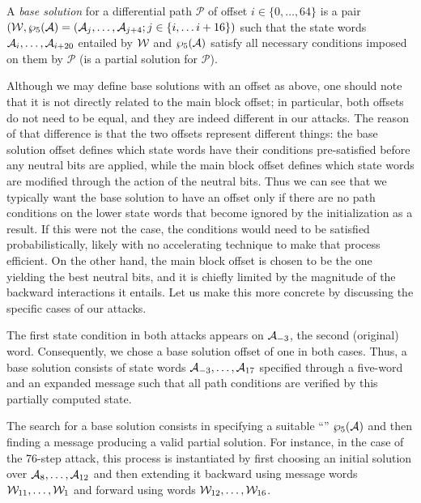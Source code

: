 \begin{defi}
A \emph{base solution} for a differential path $\mathcal{P}$ of offset $i \in \{0,\ldots,64\}$ is a pair $(\mathcal{W},  \wp_5(\mathcal{A}) = (\mathcal{A}_{j},\ldots,\mathcal{A}_{j+4}; j \in \{i,\ldots i + 16\})$
such that the state words $\mathcal{A}_i, \ldots, \mathcal{A}_{i+20}$ entailed by $\mathcal{W}$ and $\wp_5(\mathcal{A})$ satisfy all necessary conditions imposed on them by $\mathcal{P}$ (\ie is a partial solution for $\mathcal{P}$).
\end{defi}

Although we may define base solutions with an offset as above, one should note that it is not directly related to the main block offset; in particular, both offsets do not need to be equal, and they
are indeed different in our attacks. The reason of that difference is that the two offsets represent different things: the base solution offset defines which state words have their conditions pre-satisfied
before any neutral bits are applied, while the main block offset defines which state words are modified through the action of the neutral bits. Thus we can see that we typically want the base solution
to have an offset only if there are no path conditions on the lower state words that become ignored by the initialization as a result. If this were not the case, the conditions would need to be
satisfied probabilistically, likely with no accelerating technique to make that process efficient. On the other hand, the main block offset is chosen to be the one yielding the best neutral bits, and
it is chiefly limited by the magnitude of the backward interactions it entails.
Let us make this more concrete by discussing the specific cases of our attacks.

\medskip

The first state condition in both attacks appears on $\mathcal{A}_{-3}$, \ie the second (original) \iv word. Consequently, we chose a base solution offset of one in both cases. 
Thus, a base solution consists of state words $\mathcal{A}_{-3},\ldots,\mathcal{A}_{17}$ specified through a five-word \iv and an expanded message such that all path conditions are verified by
this partially computed state.

The search for a base solution consists in specifying a suitable ``\iv'' $\wp_5(\mathcal{A})$ and then finding a message producing a valid partial solution. For instance, in the case of the 76-step
attack, this process is instantiated by first choosing an initial solution over $\mathcal{A}_8,\ldots,\mathcal{A}_{12}$ and then extending it backward using message words $\mathcal{W}_{11},\ldots,\mathcal{W}_1$
and forward using words $\mathcal{W}_{12},\ldots,\mathcal{W}_{16}$.

